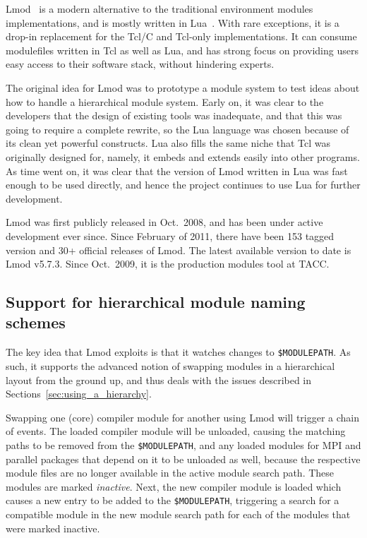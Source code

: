 Lmod~\cite{laytonLmod,taccSecretSauce,taccLmod} is a modern alternative to
the traditional environment modules implementations, and is mostly written in
Lua~\cite{LuaBook}. With rare exceptions, it is a drop-in replacement for the Tcl/C
and Tcl-only implementations. It can consume modulefiles written in Tcl as well as
Lua, and has strong focus on providing users easy access to their software stack,
without hindering experts.

The original idea for Lmod was to prototype a module system to test
ideas about how to handle a hierarchical module system.  Early on, it was clear
to the developers that the design of existing tools was inadequate, and that this
was going to require a complete rewrite, so the Lua language was chosen because
of its clean yet powerful constructs.  Lua also fills the same niche that Tcl was
originally designed for, namely, it embeds and extends easily into
other programs.  As time went on, it was clear that the version of Lmod written
in Lua was fast enough to be used directly, and hence the project
continues to use Lua for further development.

Lmod was first publicly released in Oct.~2008, and has been under active development
ever since. Since February of 2011, there have been 153 tagged version and
30+ official releases of Lmod. The latest available version to date is Lmod v5.7.3.
Since Oct.~2009, it is the production modules tool at TACC.

\subsection{Support for hierarchical module naming schemes}

The key idea that Lmod exploits is that it watches changes to
\texttt{\small \$MODULEPATH}. As such, it supports the advanced notion of
swapping modules in a hierarchical layout from the ground up, and thus
deals with the issues described in
Sections~\ref{sec:using_a_hierarchy}.

Swapping one (core) compiler module for another using Lmod will trigger
a chain of events.  The loaded compiler module will be unloaded, 
causing the matching paths to be removed from the \texttt{\small \$MODULEPATH},
and any loaded modules for MPI and parallel packages that depend on it
to be unloaded as well, because the respective module files are no longer available
in the active module search path. These modules are marked \emph{inactive}.
Next, the new compiler module is loaded which causes a new entry
to be added to the \texttt{\small \$MODULEPATH}, triggering a search
for a compatible module in the new module search path for each of the
modules that were marked inactive.

